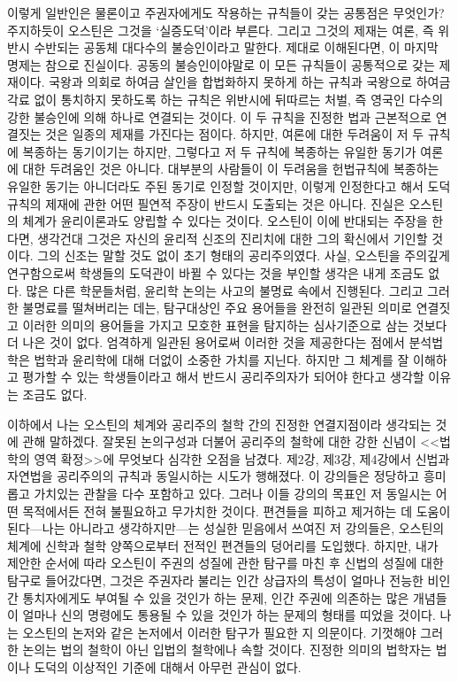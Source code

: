 이렇게 일반인은 물론이고 주권자에게도 작용하는 규칙들이 갖는
공통점은 무엇인가?
주지하듯이 오스틴은 그것을 `실증도덕'이라 부른다.
그리고 그것의 제재는 여론, 즉 위반시 수반되는 공동체 대다수의 불승인이라고
말한다.
제대로 이해된다면,
이 마지막 명제는 참으로 진실이다.
공동의 불승인이야말로 이 모든 규칙들이 공통적으로 갖는 제재이다.
국왕과 의회로 하여금 살인을 합법화하지 못하게 하는 규칙과
국왕으로 하여금 각료 없이 통치하지 못하도록 하는 규칙은
위반시에 뒤따르는 처벌, 즉 영국인 다수의 강한 불승인에 의해
하나로 연결되는 것이다.
이 두 규칙을 진정한 법과 근본적으로 연결짓는 것은
일종의 제재를 가진다는 점이다.
하지만,
여론에 대한 두려움이 저 두 규칙에 복종하는 동기이기는 하지만,
그렇다고 저 두 규칙에 복종하는 유일한 동기가 여론에 대한 두려움인 것은 아니다.
대부분의 사람들이
이 두려움을
헌법규칙에 복종하는
유일한 동기는 아니더라도 주된 동기로 인정할 것이지만,
이렇게 인정한다고 해서 도덕규칙의 제재에 관한
어떤 필연적 주장이 반드시 도출되는 것은 아니다.
진실은 오스틴의 체계가  윤리이론과도 양립할 수 있다는 것이다.
오스틴이 이에 반대되는 주장을 한다면,
생각건대 그것은 자신의 윤리적 신조의 진리치에 대한 그의 확신에서
기인할 것이다.
그의 신조는 말할 것도 없이 초기 형태의 공리주의였다.
사실,
오스틴을 주의깊게 연구함으로써 학생들의 도덕관이 바뀔 수 있다는 것을
부인할 생각은 내게 조금도 없다.
많은 다른 학문들처럼, 윤리학 논의는
사고의 불명료 속에서 진행된다.
그리고 그러한 불명료를 떨쳐버리는 데는,
탐구대상인 주요 용어들을 완전히 일관된 의미로 연결짓고
이러한 의미의 용어들을 가지고 모호한 표현을 탐지하는 심사기준으로
삼는 것보다 더 나은 것이 없다.
엄격하게 일관된 용어로써 이러한 것을 제공한다는 점에서
분석법학은 법학과 윤리학에 대해 더없이 소중한 가치를 지닌다.
하지만 그 체계를 잘 이해하고 평가할 수 있는 학생들이라고 해서
반드시 공리주의자가 되어야 한다고 생각할 이유는 조금도 없다.

이하에서 나는 오스틴의 체계와 공리주의 철학 간의 진정한 연결지점이라
생각되는 것에 관해 말하겠다.
잘못된 논의구성과 더불어 공리주의 철학에 대한 강한 신념이
<<법학의 영역 확정>>에 무엇보다 심각한 오점을 남겼다.
제2강, 제3강, 제4강에서
신법과 자연법을
공리주의의 규칙과 동일시하는 시도가 행해졌다.
이 강의들은 정당하고 흥미롭고 가치있는 관찰을 다수 포함하고 있다.
그러나 이들 강의의 목표인 저 동일시는
어떤 목적에서든
전혀 불필요하고 무가치한 것이다.
편견들을 피하고 제거하는 데 도움이 된다---나는 아니라고 생각하지만---는
성실한 믿음에서 쓰여진
저 강의들은,
오스틴의 체계에 신학과 철학 양쪽으로부터
전적인 편견들의 덩어리를 도입했다.
하지만,
내가 제안한 순서에 따라
오스틴이 주권의 성질에 관한 탐구를 마친 후
신법의 성질에 대한 탐구로 들어갔다면,
그것은
주권자라 불리는 인간 상급자의 특성이 얼마나
전능한 비인간 통치자에게도 부여될 수 있을 것인가 하는 문제,
인간 주권에 의존하는 많은 개념들이 얼마나
신의 명령에도 통용될 수 있을 것인가 하는 문제의 형태를 띠었을 것이다.
나는 오스틴의 논저와 같은 논저에서 이러한 탐구가 필요한 지 의문이다.
기껏해야
그러한 논의는
법의 철학이 아닌 입법의 철학에나
속할 것이다.
진정한 의미의 법학자는 법이나 도덕의 이상적인 기준에 대해서
아무런 관심이 없다.

